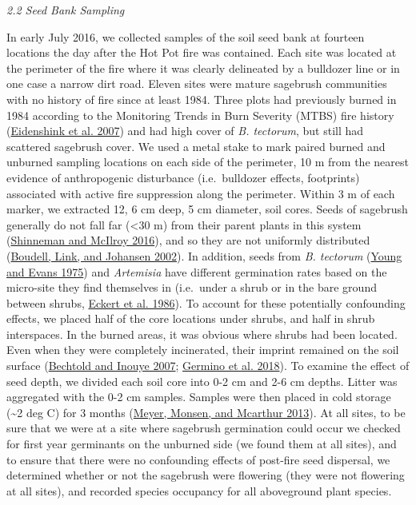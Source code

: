 \documentclass[
  12pt,
]{article}
\begin{document}
\emph{2.2 Seed Bank Sampling}

In early July 2016, we collected samples of the soil seed bank at
fourteen locations the day after the Hot Pot fire was contained. Each
site was located at the perimeter of the fire where it was clearly
delineated by a bulldozer line or in one case a narrow dirt road. Eleven
sites were mature sagebrush communities with no history of fire since at
least 1984. Three plots had previously burned in 1984 according to the
Monitoring Trends in Burn Severity (MTBS) fire history
(\protect\hyperlink{ref-Eidenshink2007}{Eidenshink et al. 2007}) and had
high cover of \emph{B. tectorum}, but still had scattered sagebrush
cover. We used a metal stake to mark paired burned and unburned sampling
locations on each side of the perimeter, 10 m from the nearest evidence
of anthropogenic disturbance (i.e.~bulldozer effects, footprints)
associated with active fire suppression along the perimeter. Within 3 m
of each marker, we extracted 12, 6 cm deep, 5 cm diameter, soil cores.
Seeds of sagebrush generally do not fall far (\textless30 m) from their
parent plants in this system
(\protect\hyperlink{ref-Shinneman2016}{Shinneman and McIlroy 2016}), and
so they are not uniformly distributed
(\protect\hyperlink{ref-Boudell2002}{Boudell, Link, and Johansen 2002}).
In addition, seeds from \emph{B. tectorum}
(\protect\hyperlink{ref-Young1975}{Young and Evans 1975}) and
\emph{Artemisia} have different germination rates based on the
micro-site they find themselves in (i.e.~under a shrub or in the bare
ground between shrubs, \protect\hyperlink{ref-Eckert1986}{Eckert et al.
1986}). To account for these potentially confounding effects, we placed
half of the core locations under shrubs, and half in shrub interspaces.
In the burned areas, it was obvious where shrubs had been located. Even
when they were completely incinerated, their imprint remained on the
soil surface (\protect\hyperlink{ref-Bechtold2007}{Bechtold and Inouye
2007}; \protect\hyperlink{ref-Germino2018}{Germino et al. 2018}). To
examine the effect of seed depth, we divided each soil core into 0-2 cm
and 2-6 cm depths. Litter was aggregated with the 0-2 cm samples.
Samples were then placed in cold storage (\textasciitilde2 deg C) for 3
months (\protect\hyperlink{ref-Meyer2013}{Meyer, Monsen, and Mcarthur
2013}). At all sites, to be sure that we were at a site where sagebrush
germination could occur we checked for first year germinants on the
unburned side (we found them at all sites), and to ensure that there
were no confounding effects of post-fire seed dispersal, we determined
whether or not the sagebrush were flowering (they were not flowering at
all sites), and recorded species occupancy for all aboveground plant
species.
\end{document}
